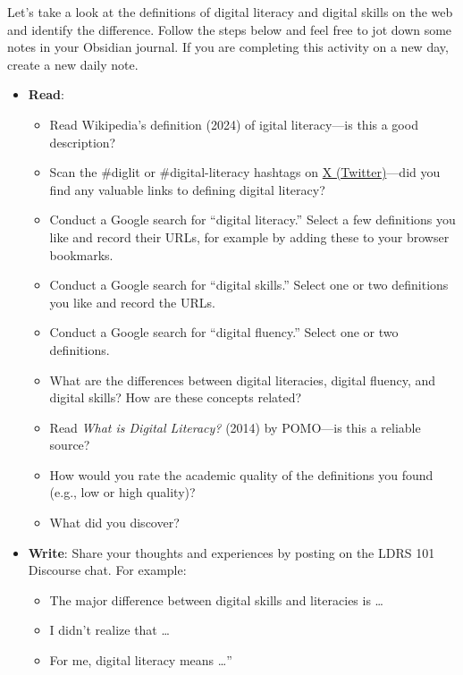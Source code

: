 \documentclass[
  letterpaper,
  DIV=11,
  numbers=noendperiod]{scrreprt}
\providecommand{\tightlist}{%
  \setlength{\itemsep}{0pt}\setlength{\parskip}{0pt}}\usepackage{longtable,booktabs,array}
\begin{document}
\begin{tcolorbox}[enhanced jigsaw, toprule=.15mm, colback=white, colframe=quarto-callout-note-color-frame, bottomtitle=1mm, leftrule=.75mm, coltitle=black, titlerule=0mm, rightrule=.15mm, colbacktitle=quarto-callout-note-color!10!white, left=2mm, title={Learning Activity}, opacitybacktitle=0.6, opacityback=0, breakable, toptitle=1mm, arc=.35mm, bottomrule=.15mm]

Let's take a look at the definitions of digital literacy and digital
skills on the web and identify the difference. Follow the steps below
and feel free to jot down some notes in your Obsidian journal. If you
are completing this activity on a new day, create a new daily note.

\begin{itemize}
\tightlist
\item
  \textbf{Read}:

  \begin{itemize}
  \tightlist
  \item
    Read Wikipedia's definition (2024) of igital literacy---is this a
    good description?
  \item
    Scan the \#diglit or \#digital-literacy hashtags on
    \href{https://x.com/home}{X (Twitter)}---did you find any valuable
    links to defining digital literacy?
  \item
    Conduct a Google search for ``digital literacy.'' Select a few
    definitions you like and record their URLs, for example by adding
    these to your browser bookmarks.
  \item
    Conduct a Google search for ``digital skills.'' Select one or two
    definitions you like and record the URLs.
  \item
    Conduct a Google search for ``digital fluency.'' Select one or two
    definitions.
  \item
    What are the differences between digital literacies, digital
    fluency, and digital skills? How are these concepts related?
  \item
    Read \emph{What is Digital Literacy?} (2014) by POMO---is this a
    reliable source?
  \item
    How would you rate the academic quality of the definitions you found
    (e.g., low or high quality)?
  \item
    What did you discover?
  \end{itemize}
\item
  \textbf{Write}: Share your thoughts and experiences by posting on the
  LDRS 101 Discourse chat. For example:

  \begin{itemize}
  \tightlist
  \item
    The major difference between digital skills and literacies is
    \ldots{}
  \item
    I didn't realize that \ldots{}
  \item
    For me, digital literacy means \ldots''
  \end{itemize}
\end{itemize}

\end{tcolorbox}
\end{document}
